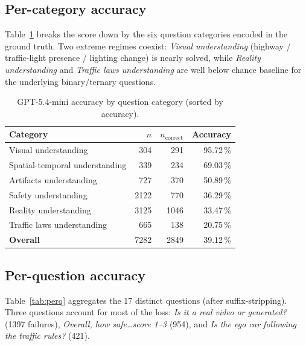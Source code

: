 \documentclass[11pt,a4paper]{article}
\newcommand{\pct}[1]{#1\,\%}
\begin{document}
\subsection{Per-category accuracy}
\label{sec:cat}

Table~\ref{tab:cat} breaks the score down by the six question
categories encoded in the ground truth. Two extreme regimes coexist:
\emph{Visual understanding} (highway / traffic-light presence / lighting
change) is nearly solved, while \emph{Reality understanding} and
\emph{Traffic laws understanding} are well below chance baseline for
the underlying binary/ternary questions.

\begin{table}[h]
\centering
\begin{tabular}{lrrr}
\toprule
Category & $n$ & $n_\mathrm{correct}$ & Accuracy \\
\midrule
Visual understanding             & 304  & 291  & \pct{95.72} \\
Spatial-temporal understanding   & 339  & 234  & \pct{69.03} \\
Artifacts understanding          & 727  & 370  & \pct{50.89} \\
Safety understanding             & 2122 & 770  & \pct{36.29} \\
Reality understanding            & 3125 & 1046 & \pct{33.47} \\
Traffic laws understanding       & 665  & 138  & \pct{20.75} \\
\midrule
\textbf{Overall}                 & 7282 & 2849 & \pct{39.12} \\
\bottomrule
\end{tabular}
\caption{GPT-5.4-mini accuracy by question category (sorted by
accuracy).}
\label{tab:cat}
\end{table}

\subsection{Per-question accuracy}

Table~\ref{tab:perq} aggregates the 17 distinct questions (after
suffix-stripping). Three questions account for most of the loss:
\emph{Is it a real video or generated?} (\num{1397} failures),
\emph{Overall, how safe\dots score 1--3} (\num{954}), and
\emph{Is the ego car following the traffic rules?} (\num{421}).
\end{document}
